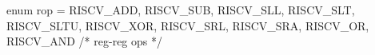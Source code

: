 enum rop = {RISCV_ADD, RISCV_SUB, RISCV_SLL, RISCV_SLT,
            RISCV_SLTU, RISCV_XOR, RISCV_SRL, RISCV_SRA,
            RISCV_OR, RISCV_AND}                  /* reg-reg ops */
